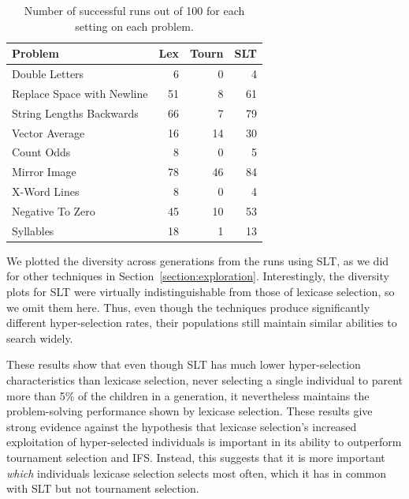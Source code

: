 \documentclass{sig-alternate}
\begin{document}
\begin{table}[t]
\centering
\caption{Number of successful runs out of 100 for each setting on each problem.}
\label{table:slt-results}
\begin{tabular}{lrrr}
\toprule
\textbf{Problem}                    & \textbf{Lex} & \textbf{Tourn} & \textbf{SLT} \\
\midrule
Double Letters             & 6        & 0          & 4   \\
Replace Space with Newline & 51       & 8          & 61  \\
String Lengths Backwards   & 66       & 7          & 79  \\
Vector Average             & 16       & 14         & 30  \\
Count Odds                 & 8        & 0          & 5   \\
Mirror Image               & 78       & 46         & 84  \\
X-Word Lines               & 8        & 0          & 4   \\
Negative To Zero           & 45       & 10         & 53  \\
Syllables                  & 18       & 1          & 13  \\
\bottomrule
\end{tabular}
\end{table}

We plotted the diversity across generations from the runs using SLT, as we did for other techniques in Section~\ref{section:exploration}. Interestingly, the diversity plots for SLT were virtually indistinguishable from those of lexicase selection, so we omit them here. Thus, even though the techniques produce significantly different hyper-selection rates, their populations still maintain similar abilities to search widely.

These results show that even though SLT has much lower hyper-selection characteristics than lexicase selection, never selecting a single individual to parent more than 5\% of the children in a generation, it nevertheless maintains the problem-solving performance shown by lexicase selection. These results give strong evidence against the hypothesis that lexicase selection's increased exploitation of hyper-selected individuals is important in its ability to outperform tournament selection and IFS. Instead, this suggests that it is more important \textit{which} individuals lexicase selection selects most often, which it has in common with SLT but not tournament selection.
\end{document}

